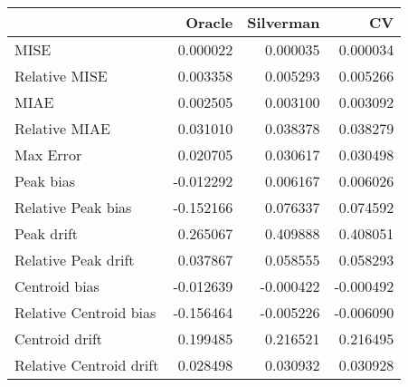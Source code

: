 \begin{tabular}{lrrr}
  \hline
 & Oracle & Silverman & CV \\ 
  \hline
MISE & 0.000022 & 0.000035 & 0.000034 \\ 
  Relative MISE & 0.003358 & 0.005293 & 0.005266 \\ 
  MIAE & 0.002505 & 0.003100 & 0.003092 \\ 
  Relative MIAE & 0.031010 & 0.038378 & 0.038279 \\ 
  Max Error & 0.020705 & 0.030617 & 0.030498 \\ 
  Peak bias & -0.012292 & 0.006167 & 0.006026 \\ 
  Relative Peak bias & -0.152166 & 0.076337 & 0.074592 \\ 
  Peak drift & 0.265067 & 0.409888 & 0.408051 \\ 
  Relative Peak drift & 0.037867 & 0.058555 & 0.058293 \\ 
  Centroid bias & -0.012639 & -0.000422 & -0.000492 \\ 
  Relative Centroid bias & -0.156464 & -0.005226 & -0.006090 \\ 
  Centroid drift & 0.199485 & 0.216521 & 0.216495 \\ 
  Relative Centroid drift & 0.028498 & 0.030932 & 0.030928 \\ 
   \hline
\end{tabular}

